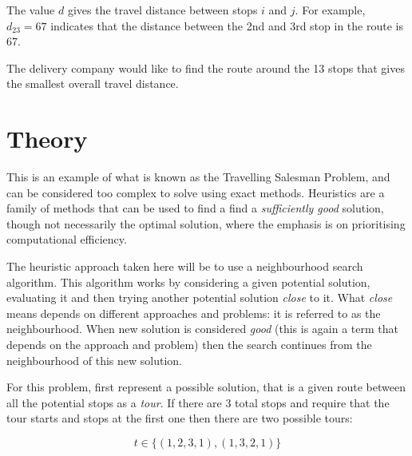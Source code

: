 The value \(d\) gives the travel distance between
stops \(i\) and \(j\). For example, \(d_{23}=67\) %
indicates that the distance between the 2nd and 3rd stop in the route is 67. %




The delivery company would like to find the route around the 13 stops that gives
the smallest overall travel distance.


\section{Theory}\label{sec:theory}

This is an example of what is known as the Travelling Salesman Problem, %
and can be considered too complex to solve using exact methods.
Heuristics are a family of methods that can be used to find a find a
\emph{sufficiently good} solution, though not necessarily the optimal solution,
where the emphasis is on prioritising computational efficiency.

The heuristic approach taken here will be to use a neighbourhood search algorithm.
This algorithm works by considering a given potential solution, evaluating it
and then trying another potential solution \emph{close} to it. What \emph{close}
means depends on different approaches and problems: it is referred to as the
neighbourhood. When new solution is considered \emph{good} (this is
again a term that depends on the approach and problem) then the search
continues from the neighbourhood of this new solution.

For this problem, first represent a possible solution, that is a given route
between all the potential stops as a \emph{tour}. If there are 3 total stops
and require that the tour starts and stops at the first one then there are two
possible tours:

\[
    t \in \{(1, 2, 3, 1), (1, 3, 2, 1)\}
\]

